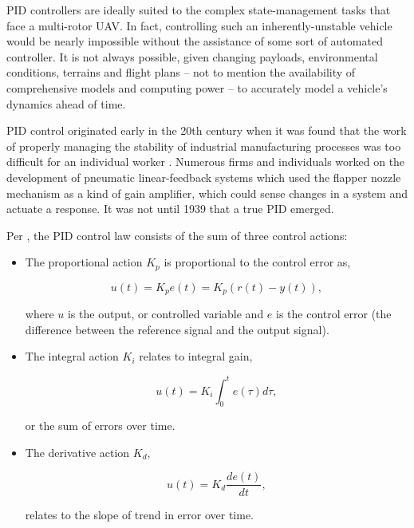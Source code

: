 PID controllers are ideally suited to the complex state-management tasks that face a multi-rotor UAV. In fact, controlling such an inherently-unstable vehicle would be nearly impossible without the assistance of some sort of automated controller. It is not always possible, given changing payloads, environmental conditions, terrains and flight plans -- not to mention the availability of comprehensive models and computing power -- to accurately model a vehicle’s dynamics ahead of time. 

PID control originated early in the 20th century when it was found that the work of properly managing the stability of industrial manufacturing processes was too difficult for an individual worker \cite{Bennett2001}. Numerous firms and individuals worked on the development of pneumatic linear-feedback systems which used the flapper nozzle mechanism as a kind of gain amplifier, which could sense changes in a system and actuate a response. It was not until 1939 that a true PID emerged.

Per \cite{Soediono1989}, the PID control law consists of the sum of three control actions:

\begin{itemize}
\item The proportional action $K_p$ is proportional to the control error as, 

\begin{equation}
u(t) = K_p e(t) = K_p(r(t) - y(t)),
\end{equation}

where $u$ is the output, or controlled variable and $e$ is the control error (the difference between the reference signal and the output signal). 

\item The integral action $K_i$ relates to integral gain, 

\begin{equation}
u(t) = K_i \int_0^t e(\tau) d\tau,
\end{equation}

or the sum of errors over time. 

\item The derivative action $K_d$, 

\begin{equation}
u(t) = K_d \frac{de(t)}{dt},
\end{equation}

relates to the slope of trend in error over time.
\end{itemize}


